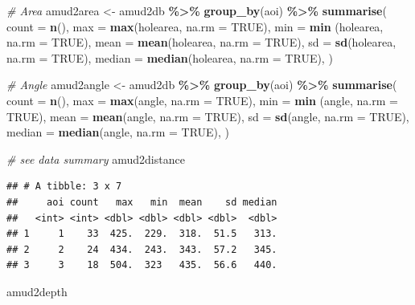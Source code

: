 \documentclass[
]{article}
\newenvironment{Shaded}{\begin{snugshade}}{\end{snugshade}}
\newcommand{\AttributeTok}[1]{\textcolor[rgb]{0.13,0.29,0.53}{#1}}
\newcommand{\CommentTok}[1]{\textcolor[rgb]{0.56,0.35,0.01}{\textit{#1}}}
\newcommand{\ConstantTok}[1]{\textcolor[rgb]{0.56,0.35,0.01}{#1}}
\newcommand{\FunctionTok}[1]{\textcolor[rgb]{0.13,0.29,0.53}{\textbf{#1}}}
\newcommand{\NormalTok}[1]{#1}
\newcommand{\OtherTok}[1]{\textcolor[rgb]{0.56,0.35,0.01}{#1}}
\newcommand{\SpecialCharTok}[1]{\textcolor[rgb]{0.81,0.36,0.00}{\textbf{#1}}}
\begin{document}
\begin{Shaded}
\begin{Highlighting}[]
\CommentTok{\# Area}
\NormalTok{amud2area }\OtherTok{\textless{}{-}}\NormalTok{ amud2db }\SpecialCharTok{\%\textgreater{}\%} \FunctionTok{group\_by}\NormalTok{(aoi) }\SpecialCharTok{\%\textgreater{}\%}
      \FunctionTok{summarise}\NormalTok{(}
      \AttributeTok{count =} \FunctionTok{n}\NormalTok{(),}
      \AttributeTok{max =} \FunctionTok{max}\NormalTok{(holearea, }\AttributeTok{na.rm =} \ConstantTok{TRUE}\NormalTok{),}
      \AttributeTok{min =} \FunctionTok{min}\NormalTok{ (holearea, }\AttributeTok{na.rm =} \ConstantTok{TRUE}\NormalTok{),}
      \AttributeTok{mean =} \FunctionTok{mean}\NormalTok{(holearea, }\AttributeTok{na.rm =} \ConstantTok{TRUE}\NormalTok{),}
      \AttributeTok{sd =} \FunctionTok{sd}\NormalTok{(holearea, }\AttributeTok{na.rm =} \ConstantTok{TRUE}\NormalTok{),}
      \AttributeTok{median =} \FunctionTok{median}\NormalTok{(holearea, }\AttributeTok{na.rm =} \ConstantTok{TRUE}\NormalTok{),}
\NormalTok{  ) }

\CommentTok{\# Angle}
\NormalTok{amud2angle }\OtherTok{\textless{}{-}}\NormalTok{ amud2db }\SpecialCharTok{\%\textgreater{}\%} \FunctionTok{group\_by}\NormalTok{(aoi) }\SpecialCharTok{\%\textgreater{}\%}
      \FunctionTok{summarise}\NormalTok{(}
      \AttributeTok{count =} \FunctionTok{n}\NormalTok{(),}
      \AttributeTok{max =} \FunctionTok{max}\NormalTok{(angle, }\AttributeTok{na.rm =} \ConstantTok{TRUE}\NormalTok{),}
      \AttributeTok{min =} \FunctionTok{min}\NormalTok{ (angle, }\AttributeTok{na.rm =} \ConstantTok{TRUE}\NormalTok{),}
      \AttributeTok{mean =} \FunctionTok{mean}\NormalTok{(angle, }\AttributeTok{na.rm =} \ConstantTok{TRUE}\NormalTok{),}
      \AttributeTok{sd =} \FunctionTok{sd}\NormalTok{(angle, }\AttributeTok{na.rm =} \ConstantTok{TRUE}\NormalTok{),}
      \AttributeTok{median =} \FunctionTok{median}\NormalTok{(angle, }\AttributeTok{na.rm =} \ConstantTok{TRUE}\NormalTok{),}
\NormalTok{  ) }

\CommentTok{\# see data summary}
\NormalTok{amud2distance}
\end{Highlighting}
\end{Shaded}

\begin{verbatim}
## # A tibble: 3 x 7
##     aoi count   max   min  mean    sd median
##   <int> <int> <dbl> <dbl> <dbl> <dbl>  <dbl>
## 1     1    33  425.  229.  318.  51.5   313.
## 2     2    24  434.  243.  343.  57.2   345.
## 3     3    18  504.  323   435.  56.6   440.
\end{verbatim}

\begin{Shaded}
\begin{Highlighting}[]
\NormalTok{amud2depth}
\end{Highlighting}
\end{Shaded}
\end{document}
